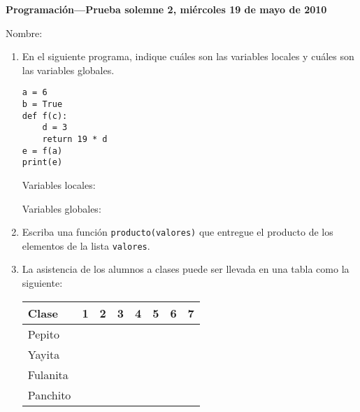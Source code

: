 \documentclass[10pt,spanish]{article}
\newcommand{\onelinerule}{\rule[2.3ex]{0pt}{0pt}}
\newcommand{\nombre}{\framebox[0.8\textwidth]{\onelinerule}}
\newcommand{\T}{\ding{51}}
\newcommand{\F}{}
\begin{document}
  \thispagestyle{empty}
  \pagestyle{empty}
  {\Large\bfseries Programación---Prueba solemne 2, miércoles 19 de mayo de 2010}

  Nombre: \nombre

  \begin{enumerate}
%
%
    \item
      En el siguiente programa,
      indique cuáles son las variables locales
      y cuáles son las variables globales.
      \begin{minipage}{5em}
          \begin{lstlisting}
a = 6
b = True
def f(c):
    d = 3
    return 19 * d
e = f(a)
print(e)
          \end{lstlisting}
      \end{minipage}

      Variables locales:

      \framebox[\textwidth]{\rule[5.0ex]{0pt}{0pt}}

      Variables globales:

      \framebox[\textwidth]{\rule[5.0ex]{0pt}{0pt}}

    \item
      Escriba una función \lstinline+producto(valores)+
      que entregue el producto de los elementos
      de la lista \lstinline+valores+.

    \newpage
    \item
      La asistencia de los alumnos a clases
      puede ser llevada en una tabla como la siguiente:

      \begin{tabular}{|l|c|c|c|c|c|c|c|}\hline
        Clase    & 1& 2& 3& 4& 5& 6& 7\\\hline\hline
        Pepito   &\T&\T&\T&\F&\F&\F&\F\\\hline
        Yayita   &\T&\T&\T&\F&\T&\F&\T\\\hline
        Fulanita &\T&\T&\T&\T&\T&\T&\T\\\hline
        Panchito &\T&\T&\T&\F&\T&\T&\T\\\hline
      \end{tabular}


\end{enumerate}
\end{document}
